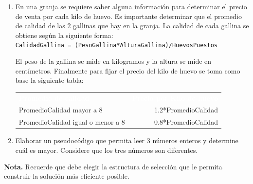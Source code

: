 \documentclass[spanish,11pt,twoside]{article}
\makeatletter
\DeclareRobustCommand\ttfamily
{\not@math@alphabet\ttfamily\mathtt
	\fontfamily\ttdefault\footnotesize\selectfont} %
\newcommand{\head}[1]{ %
	\textcolor{white}{\textbf{#1}}}
\renewcommand{\arraystretch}{1.5} %
\newcommand{\rocketbox}[1]{
	\awesomebox[uasblue]{2pt}{\faRocket}{uasblue}{#1}
}
\providecommand{\tightlist}{%
	\setlength{\itemsep}{3pt}\setlength{\parskip}{10pt}}
\makeatother
\begin{document}
\begin{enumerate}
	\tightlist %
	\item En una granja se requiere saber alguna información para determinar el precio de venta 
	por cada kilo de huevo. Es importante determinar que el promedio de calidad de las 2 gallinas que hay en la granja. La calidad de cada gallina se obtiene según la siguiente forma:\\
	\texttt{CalidadGallina = (PesoGallina*AlturaGallina)/HuevosPuestos}


	El peso de la gallina se mide en kilogramos y la altura se mide en centímetros.
	Finalmente para fijar el precio del kilo de huevo se toma como base la siguiente tabla:

	

	\begin{table}[ht]
		\renewcommand{\arraystretch}{1.5} %
		\centering\footnotesize%
		\sffamily%
		
		\label{table:linux:distributions}
		\begin{tabular}{lr}
			\rowcolor{uasblue}%
			\head{Promedio de calidad} & \head{Precio por Kilo de huevo} \\
			PromedioCalidad mayor a 8 			& 1.2*PromedioCalidad \\
			PromedioCalidad igual o menor a 8 	& 0.8*PromedioCalidad \\
		\end{tabular}
	\end{table}
	
	
	\item Elaborar un pseudocódigo que permita leer 3 números enteros y determine cuál es mayor. Considere que los tres números son diferentes.
	
		
\end{enumerate}


\begin{noteblock} %
	\textcolor{uasblue}{\textbf{\textsf{Nota.}}} Recuerde que debe elegir la estructura de selección que le permita construir la solución más eficiente posible. 
	
\end{noteblock}

\end{document}
